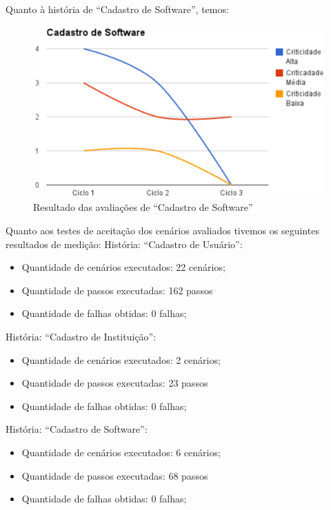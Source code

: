 Quanto à história de ``Cadastro de  Software'', temos:

\begin{figure}[h!]
    	\centering
    	\includegraphics[keepaspectratio=true,scale=0.62]
      		{figuras/graf03.eps}
    	\caption{Resultado das avaliações de ``Cadastro de Software''}
    	\label{avaliacaosoftware}
\end{figure}

\newpage
Quanto aos testes de aceitação dos cenários avaliados tivemos os seguintes resultados de medição:
História: ``Cadastro de Usuário'':
\begin{itemize}
	\item Quantidade de cenários executados: 22 cenários;
	\item Quantidade de passos executadas: 162 passos
	\item Quantidade de falhas obtidas: 0 falhas;
\end{itemize} 

História: ``Cadastro de Instituição'':
\begin{itemize}
	\item Quantidade de cenários executados: 2 cenários;
	\item Quantidade de passos executadas: 23 passos
	\item Quantidade de falhas obtidas: 0 falhas;
\end{itemize} 

História: ``Cadastro de Software'':
\begin{itemize}
	\item Quantidade de cenários executados: 6 cenários;
	\item Quantidade de passos executadas: 68 passos
	\item Quantidade de falhas obtidas: 0 falhas;
\end{itemize} 

